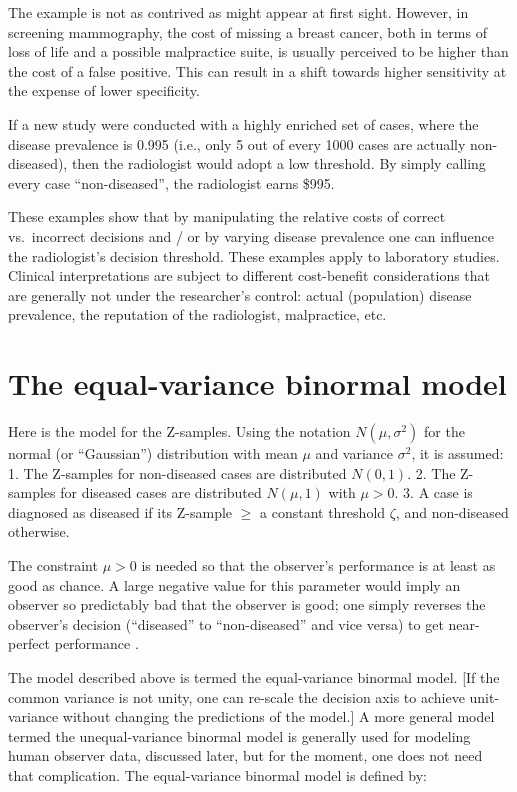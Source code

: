 \documentclass[
]{book}
\begin{document}
The example is not as contrived as might appear at first sight. However, in screening mammography, the cost of missing a breast cancer, both in terms of loss of life and a possible malpractice suite, is usually perceived to be higher than the cost of a false positive. This can result in a shift towards higher sensitivity at the expense of lower specificity.

If a new study were conducted with a highly enriched set of cases, where the disease prevalence is 0.995 (i.e., only 5 out of every 1000 cases are actually non-diseased), then the radiologist would adopt a low threshold. By simply calling every case ``non-diseased'', the radiologist earns \$995.

These examples show that by manipulating the relative costs of correct vs.~incorrect decisions and / or by varying disease prevalence one can influence the radiologist's decision threshold. These examples apply to laboratory studies. Clinical interpretations are subject to different cost-benefit considerations that are generally not under the researcher's control: actual (population) disease prevalence, the reputation of the radiologist, malpractice, etc.

\hypertarget{binary-task-model-equal-variance-binormal-model}{%
\section{The equal-variance binormal model}\label{binary-task-model-equal-variance-binormal-model}}

Here is the model for the Z-samples. Using the notation \(N(\mu,\sigma^2)\) for the normal (or ``Gaussian'') distribution with mean \(\mu\) and variance \(\sigma^2\), it is assumed:
1. The Z-samples for non-diseased cases are distributed \(N(0,1)\).
2. The Z-samples for diseased cases are distributed \(N(\mu,1)\) with \(\mu>0\).
3. A case is diagnosed as diseased if its Z-sample \(\geq\) a constant threshold \(\zeta\), and non-diseased otherwise.

The constraint \(\mu>0\) is needed so that the observer's performance is at least as good as chance. A large negative value for this parameter would imply an observer so predictably bad that the observer is good; one simply reverses the observer's decision (``diseased'' to ``non-diseased'' and vice versa) to get near-perfect performance .

The model described above is termed the equal-variance binormal model. {[}If the common variance is not unity, one can re-scale the decision axis to achieve unit-variance without changing the predictions of the model.{]} A more general model termed the unequal-variance binormal model is generally used for modeling human observer data, discussed later, but for the moment, one does not need that complication. The equal-variance binormal model is defined by:
\end{document}
